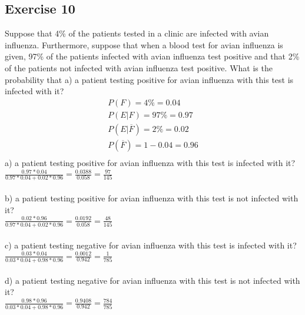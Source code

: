 \documentclass[12pt]{article}
\begin{document}
\subsection*{Exercise 10}
Suppose that 4\% of the patients tested in a clinic are infected with avian influenza. Furthermore, suppose that when a blood test for avian influenza is given, 97\% of the patients infected with avian influenza test positive and that 2\% of the patients not infected with avian influenza test positive. What is the probability that a) a patient testing positive for avian influenza with this test is infected with it?\\
\begin{equation}\nonumber
    \begin{split}
        P(F)=4\%=0.04\\
        P(E|F)=97\%=0.97\\
        P(E|\overline{F})=2\%=0.02\\
        P(\overline{F})=1-0.04=0.96\\
    \end{split}
\end{equation}
a) a patient testing positive for avian influenza with this test is infected with it?\\
$\frac{0.97*0.04}{0.97*0.04+0.02*0.96}=\frac{0.0388}{0.058}=\frac{97}{145}$\\
\\
b) a patient testing positive for avian influenza with this test is not infected with it? \\
$\frac{0.02*0.96}{0.97*0.04+0.02*0.96}=\frac{0.0192}{0.058}=\frac{48}{145}$\\
\\
c) a patient testing negative for avian influenza with this test is infected with it?\\
$\frac{0.03*0.04}{0.03*0.04+0.98*0.96}=\frac{0.0012}{0.942}=\frac{1}{785}$\\
\\
d) a patient testing negative for avian influenza with this test is not infected with it?\\
$\frac{0.98*0.96}{0.03*0.04+0.98*0.96}=\frac{0.9408}{0.942}=\frac{784}{785}$\\
\\
\end{document}
